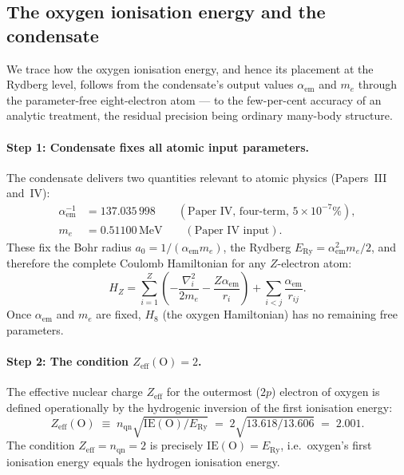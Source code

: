 \documentclass[11pt,a4paper]{article}
\theoremstyle{definition}
\theoremstyle{remark}
\newcommand{\ERy}{E_{\mathrm{Ry}}}
\newcommand{\aem}{\alpha_{\mathrm{em}}}
\newcommand{\IE}{\mathrm{IE}}
\begin{document}
\subsection{The oxygen ionisation energy and the condensate}
\label{P11:sec:zeff_derivation}

We trace how the oxygen ionisation energy, and hence its placement
at the Rydberg level, follows from the condensate's output values
$\aem$ and $m_e$ through the parameter-free eight-electron atom ---
to the few-per-cent accuracy of an analytic treatment, the residual
precision being ordinary many-body structure.

\paragraph{Step 1: Condensate fixes all atomic input parameters.}
The condensate delivers two quantities relevant to atomic physics
(Papers~III and~IV):
\begin{align}
  \aem^{-1} &= 137.035\,998 \qquad (\text{Paper~IV, four-term, }5\times10^{-7}\%), \\
  m_e       &= 0.51100\,\mathrm{MeV} \qquad (\text{Paper~IV input}).
\end{align}
These fix the Bohr radius $a_0 = 1/(\aem m_e)$, the Rydberg $\ERy = \aem^2 m_e/2$,
and therefore the complete Coulomb Hamiltonian for any $Z$-electron atom:
\begin{equation}
  H_Z = \sum_{i=1}^Z \left(-\frac{\nabla_i^2}{2m_e} - \frac{Z\aem}{r_i}\right)
       + \sum_{i<j} \frac{\aem}{r_{ij}}.
  \label{P11:eq:HZ}
\end{equation}
Once $\aem$ and $m_e$ are fixed, $H_8$ (the oxygen Hamiltonian) has
no remaining free parameters.

\paragraph{Step 2: The condition $Z_\mathrm{eff}(\mathrm{O})=2$.}
The effective nuclear charge $Z_\mathrm{eff}$ for the outermost ($2p$) electron
of oxygen is defined operationally by the hydrogenic inversion of the
first ionisation energy:
\begin{equation}
  Z_\mathrm{eff}(\mathrm{O}) \;\equiv\; n_\mathrm{qn}\sqrt{\IE(\mathrm{O})/\ERy}
  \;=\; 2\sqrt{13.618/13.606} \;=\; 2.001.
  \label{P11:eq:Zeff_def}
\end{equation}
The condition $Z_\mathrm{eff}=n_\mathrm{qn}=2$ is precisely $\IE(\mathrm{O})=\ERy$,
i.e.\ oxygen's first ionisation energy equals the hydrogen ionisation energy.
\end{document}
